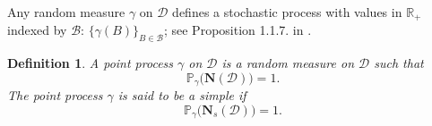 \documentclass[twoside,11pt]{book}
\newtheorem{definition}{Definition}
\numberwithin{theorem}{chapter}
\numberwithin{definition}{chapter}
\numberwithin{proposition}{chapter}
\numberwithin{corollary}{chapter}
\numberwithin{example}{chapter}
\numberwithin{lemma}{chapter}
\numberwithin{assumption}{chapter}
\begin{document}
Any random measure $\gamma$ on $\mathcal{D}$ defines a stochastic process with values in $\mathbb{R}_{+}$ indexed by $\mathcal{B}$: $\{\gamma(B)\}_{B \in \mathcal{B}}$; see Proposition  1.1.7. in \citep*{BaBlKa20}.

\begin{definition}
A point process $\gamma$ on $\mathcal{D}$ is a random measure on $\mathcal{D}$ such that
\begin{equation}
\mathbb{P}_{\gamma} \big(\mathbf{N} (\mathcal{D}) \big) = 1.
\end{equation}
The point process $\gamma$ is said to be a simple if 
\begin{equation}
\mathbb{P}_{\gamma}\big(\mathbf{N}_{s}(\mathcal{D})\big) = 1.
\end{equation}

\end{definition}
\end{document}
